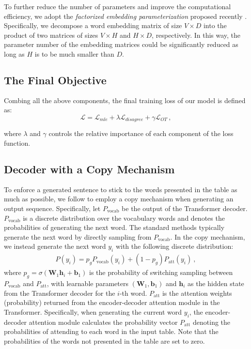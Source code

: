 \documentclass[11pt,a4paper]{article}
\begin{document}
To further reduce the number of parameters and improve the computational efficiency, we adopt the {\em factorized embedding parameterization} proposed recently \cite{ALBERT2019}. Specifically, we decompose a word embedding matrix of size $V\times D$ into the product of two matrices of sizes $V\times H$ and $H\times D$, respectively. In this way, the parameter number of the embedding matrices could be significantly reduced as long as $H$ is to be much smaller than $D$.

\subsection{The Final Objective}

Combing all the above components, the final training loss of our model is defined as:
\vspace{-0.2cm}
\begin{equation}
\mathcal{L} = \mathcal{L}_{mle} + \lambda \mathcal{L}_{disagree} +  \gamma \mathcal{L}_{OT}~,
\end{equation}\par\vspace{-0.2cm}
\noindent where $\lambda$ and $\gamma$ controls the relative importance of each component of the loss function. 

\subsection {Decoder with a Copy Mechanism}
To enforce a generated sentence to stick to the words presented in the table as much as possible, we follow
\cite{see2017} to employ a copy mechanism when generating an output sequence. Specifically, let $P_{\text{vocab}}$ be the output of the Transformer decoder. $P_{\text{vocab}}$ is a discrete distribution over the vocabulary words and denotes the probabilities of generating the next word. The standard methods typically generate the next word by directly sampling from $P_{\text{vocab}}$. In the copy mechanism, we instead generate the next word $y_i$ with the following discrete distribution:
\begin{align*}
    P(y_i) = p_gP_{\text{vocab}}(y_i) + (1 - p_g)P_{\text{att}}(y_i)~,
\end{align*}
where $p_{g} = \sigma (\bm{W}_1 \bm{h}_i +\bm{b}_1)$ is the probability of switching sampling between $P_{\text{vocab}}$ and $P_{\text{att}}$, with learnable parameters $(\bm{W}_1, \bm{b}_1)$ and $\bm{h}_i$ as the hidden state from the Transformer decoder for the $i$-th word. $P_{\text{att}}$ is the attention weights (probability) returned from the encoder-decoder attention module in the Transformer. Specifically, when generating the current word $y_i$, the encoder-decoder attention module calculates the probability vector $P_{\text{att}}$ denoting the probabilities of attending to each word in the input table. Note that the probabilities of the words not presented in the table are set to zero.
\end{document}
